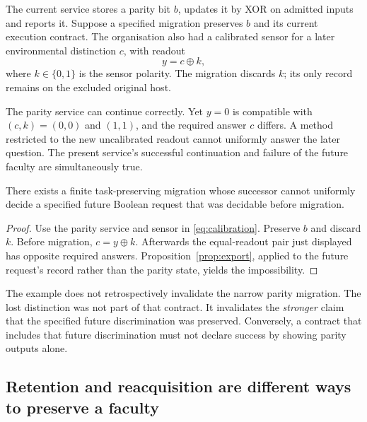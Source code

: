 The current service stores a parity bit \(b\), updates it by XOR on admitted inputs and reports it. Suppose a specified migration preserves \(b\) and its current execution contract. The organisation also had a calibrated sensor for a later environmental distinction \(c\), with readout
\begin{equation}
y=c\oplus k,
\label{eq:calibration}
\end{equation}
where \(k\in\{0,1\}\) is the sensor polarity. The migration discards \(k\); its only record remains on the excluded original host.

The parity service can continue correctly. Yet \(y=0\) is compatible with \((c,k)=(0,0)\) and \((1,1)\), and the required answer \(c\) differs. A method restricted to the new uncalibrated readout cannot uniformly answer the later question. The present service's successful continuation and failure of the future faculty are simultaneously true.

\begin{proposition}
\label{prop:futureloss}
There exists a finite task-preserving migration whose successor cannot uniformly decide a specified future Boolean request that was decidable before migration.
\end{proposition}
\begin{proof}
Use the parity service and sensor in \eqref{eq:calibration}. Preserve \(b\) and discard \(k\). Before migration, \(c=y\oplus k\). Afterwards the equal-readout pair just displayed has opposite required answers. Proposition~\ref{prop:export}, applied to the future request's record rather than the parity state, yields the impossibility.
\end{proof}

The example does not retrospectively invalidate the narrow parity migration. The lost distinction was not part of that contract. It invalidates the \emph{stronger} claim that the specified future discrimination was preserved. Conversely, a contract that includes that future discrimination must not declare success by showing parity outputs alone.

\subsection{Retention and reacquisition are different ways to preserve a faculty}

